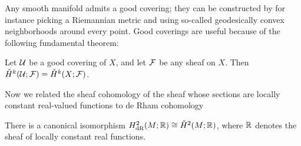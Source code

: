 \documentclass[parskip=half]{scrartcl}
\begin{document}
Any smooth manifold admits a good covering; they can be constructed by for instance picking a Riemannian metric and using so-called geodesically convex neighborhoods around every point. Good coverings are useful because of the following fundamental theorem:

\begin{onboard}
\begin{thm}[Leray]
	Let $\mathcal{U}$ be a good covering of $X$, and let $\mathcal{F}$ be any sheaf on $X$. Then $\check H^k(\mathcal{U};\mathcal{F})=\check H^k(X;\mathcal{F})$.
\end{thm}
\end{onboard}

Now we related the sheaf cohomology of the sheaf whose sections are locally constant real-valued functions to de Rham cohomology

\begin{onboard}
\begin{prop}\label{prop:dRCech}
	There is a canonical isomorphism $H^2_\text{dR}(M;\mathbb{R})\cong \check H^2(M;\mathbb{R})$, where $\mathbb{R}$ denotes the sheaf of locally constant real functions.
\end{prop}
\end{onboard}
\end{document}
